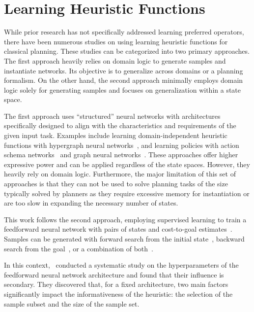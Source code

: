 \documentclass[ppgc,diss,english]{iiufrgs}
\begin{document}
\section{Learning Heuristic Functions}
\label{sec:related-h}
While prior research has not specifically addressed learning preferred operators, there have been numerous studies on using learning heuristic functions for classical planning. These studies can be categorized into two primary approaches.
The first approach heavily relies on domain logic to generate samples and instantiate networks. Its objective is to generalize across domains or a planning formalism.
On the other hand, the second approach minimally employs domain logic solely for generating samples and focuses on generalization within a state space.

The first approach uses ``structured'' neural networks with architectures specifically designed to align with the characteristics and requirements of the given input task. Examples include learning domain-independent heuristic functions with hypergraph neural networks~\cite{Shen.etal/2020}, and learning policies with action schema networks~\cite{Toyer.etal/2018,Toyer.etal/2020} and graph neural networks~\cite{Stahlberg.etal/2022}. These approaches offer higher expressive power and can be applied regardless of the state spaces. However, they heavily rely on domain logic. Furthermore, the major limitation of this set of approaches is that they can not be used to solve planning tasks of the size typically solved by planners as they require excessive memory for instantiation or are too slow in expanding the necessary number of states.

This work follows the second approach, employing supervised learning to train a feedforward neural network with pairs of states and cost-to-goal estimates~\cite{Ferber.etal/2020a,Yu.etal/2020,Ferber.etal/2022,OToole/2022}. Samples can be generated with forward search from the initial state~\cite{Ferber.etal/2020a}, backward search from the goal~\cite{Yu.etal/2020,OToole/2022}, or a combination of both~\cite{Ferber.etal/2022}.

In this context,~\citet{Ferber.etal/2020a} conducted a systematic study on the hyperparameters of the feedforward neural network architecture and found that their influence is secondary. They discovered that, for a fixed architecture, two main factors significantly impact the informativeness of the heuristic: the selection of the sample subset and the size of the sample set.
\end{document}
